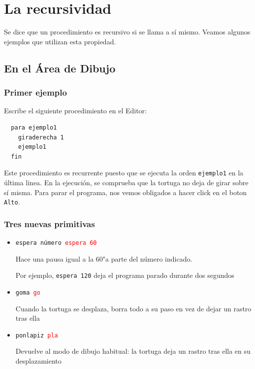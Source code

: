 \documentclass[12pt,twoside,spanish,a4paper]{report}
\begin{document}
\newpage{}

\chapter{La recursividad}
    \label{sec:La-recursividad}

Se dice que un procedimiento es recursivo si se llama a s\'i mismo.
Veamos algunos ejemplos que utilizan esta propiedad.

\section{En el \'Area de Dibujo}
   \label{sub:Recursividad-Area-Dibujo}

\subsection{Primer ejemplo}
   \label{sub:Primer-ejemplo}

Escribe el siguiente procedimiento en el Editor:
\begin{verbatim}
  para ejemplo1
    giraderecha 1
    ejemplo1
  fin \end{verbatim}
Este procedimiento es recurrente puesto que se ejecuta la orden
\texttt{ejemplo1} en la \'ultima linea. En la ejecuci\'on, se comprueba que
la tortuga no deja de girar sobre s\'i misma. Para parar el programa, nos
vemos obligados a hacer click en el boton \texttt{Alto}.

\subsection{Tres nuevas primitivas}
   \label{sub:Tres-nuevas-primitivas}

\begin{itemize}
   \item \texttt{espera n\'umero \hspace{3cm} \textcolor{red}{espera 60}}

      Hace una pausa igual a la 60"a parte del n\'umero indicado.

      Por ejemplo, \texttt{espera 120} deja el programa parado durante dos
      segundos
   \item \texttt{goma \hspace{5cm} \textcolor{red}{go}}

      Cuando la tortuga se desplaza, borra todo a su paso en vez de dejar
      un rastro tras ella
   \item \texttt{ponlapiz \hspace{4.2cm} \textcolor{red}{pla}}

      Devuelve al modo de dibujo habitual: la tortuga deja un rastro
      tras ella en su desplazamiento
\end{itemize}
\end{document}
